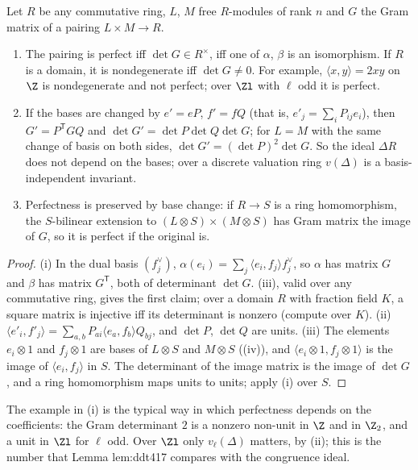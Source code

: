\begin{proposition}\label{prop:modules:gram}
Let $R$ be any commutative ring, $L$, $M$ free $R$-modules of rank $n$ and $G$ the Gram matrix of a pairing $L\times M\to R$.
\begin{enumerate}[label=(\roman*)]
\item The pairing is perfect iff $\det G\in R^\times$, iff one of $\alpha$, $\beta$ is an isomorphism. If $R$ is a domain, it is nondegenerate iff
$\det G\ne0$. For example,
$\langle x,y\rangle=2xy$ on $\Z$ is nondegenerate and not perfect; over $\Zl$ with $\ell$ odd it is perfect.
\item If the bases are changed by $e'=eP$, $f'=fQ$ (that is, $e'_j=\sum_iP_{ij}e_i$), then $G'=P^{\mathsf T}GQ$ and $\det G'=\det P\det Q\det G$; for $L=M$ with the
same change of basis on both sides, $\det G'=(\det P)^2\det G$. So the ideal $\Delta R$ does not depend on the bases; over a discrete valuation ring
$v(\Delta)$ is a basis-independent invariant.
\item Perfectness is preserved by base change: if $R\to S$ is a ring homomorphism, the $S$-bilinear extension to
$(L\otimes S)\times(M\otimes S)$ has Gram matrix the image of $G$, so it is perfect if the original is.
\end{enumerate}
\end{proposition}

\begin{proof}
(i) In the dual basis $(f_j^\vee)$, $\alpha(e_i)=\sum_j\langle e_i,f_j\rangle f_j^\vee$, so $\alpha$ has matrix $G$ and $\beta$ has matrix $G^{\mathsf T}$, both of determinant $\det G$.
(iii), valid over any commutative ring, gives the first claim; over a domain $R$ with fraction field $K$, a square matrix is injective iff its determinant is nonzero (compute over
$K$). (ii) $\langle e'_i,f'_j\rangle=\sum_{a,b}P_{ai}\langle e_a,f_b\rangle Q_{bj}$, and $\det P$, $\det Q$ are units. (iii) The elements $e_i\otimes1$ and
$f_j\otimes1$ are bases of $L\otimes S$ and $M\otimes S$ ((iv)), and $\langle e_i\otimes1,f_j\otimes1\rangle$ is the image of $\langle e_i,f_j\rangle$
in $S$. The determinant of the image matrix is the image of $\det G$, and a ring homomorphism maps units to units; apply (i) over $S$.
\end{proof}

The example in (i) is the typical way in which perfectness depends on the coefficients: the Gram determinant $2$ is a nonzero non-unit
in $\Z$ and in $\Z_2$, and a unit in $\Zl$ for $\ell$ odd. Over $\Zl$ only $v_\ell(\Delta)$ matters, by (ii); this is the number that Lemma lem:ddt417
compares with the congruence ideal.

